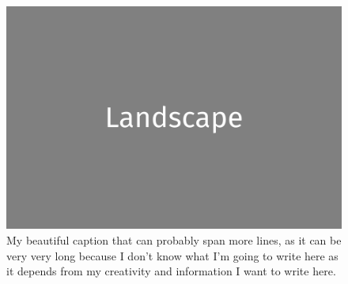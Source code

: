 \documentclass[a4paper,twoside]{book}
\begin{document}
\clearpage

\begin{figure}[H]
	\includegraphics[width=\textwidth]{landscape.png}
	\caption{My beautiful caption that can probably span more lines, as it can be very very long because I don't know what I'm going to write here as it depends from my creativity and information I want to write here.}
\end{figure}

\clearpage
\end{document}
